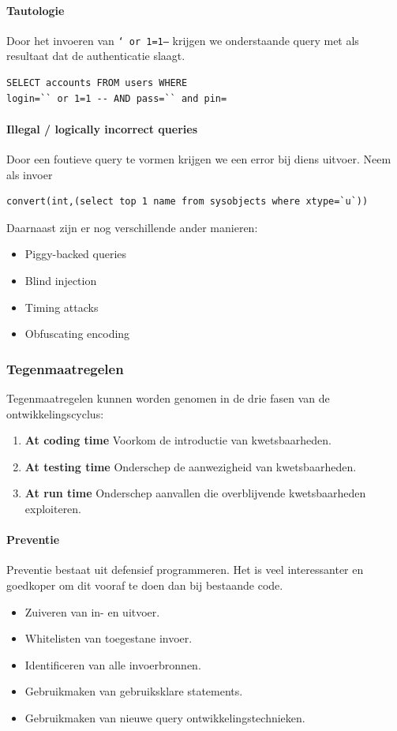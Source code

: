 \documentclass[../main.tex]{subfiles}
\begin{document}
\paragraph{Tautologie} Door het invoeren van \texttt{` or 1=1--} krijgen we onderstaande query met als resultaat dat de authenticatie slaagt.
\begin{lstlisting}[caption=Tautologie]
SELECT accounts FROM users WHERE
login=`` or 1=1 -- AND pass=`` and pin=
\end{lstlisting}

\paragraph{Illegal / logically incorrect queries} Door een foutieve query te vormen krijgen we een error bij diens uitvoer. Neem als invoer
\begin{lstlisting}[caption=Illegal input]
convert(int,(select top 1 name from sysobjects where xtype=`u`))
\end{lstlisting}
\noindent
Daarnaast zijn er nog verschillende ander manieren:
\begin{multicols}{2}
\begin{itemize}
	\item Piggy-backed queries
	\item Blind injection
	\item Timing attacks
	\item Obfuscating encoding
\end{itemize}
\end{multicols}

\subsubsection{Tegenmaatregelen}
Tegenmaatregelen kunnen worden genomen in de drie fasen van de ontwikkelingscyclus:
\begin{enumerate}
	\item \textbf{At coding time} Voorkom de introductie van kwetsbaarheden.
	\item \textbf{At testing time} Onderschep de aanwezigheid van kwetsbaarheden.
	\item \textbf{At run time} Onderschep aanvallen die overblijvende kwetsbaarheden exploiteren.
\end{enumerate}

\paragraph{Preventie} Preventie bestaat uit defensief programmeren. Het is veel interessanter en goedkoper om dit vooraf te doen dan bij bestaande code.
\begin{itemize}
	\item Zuiveren van in- en uitvoer. 
	\item Whitelisten van toegestane invoer.
	\item Identificeren van alle invoerbronnen.
	\item Gebruikmaken van gebruiksklare statements.
	\item Gebruikmaken van nieuwe query ontwikkelingstechnieken.
\end{itemize}
\end{document}
